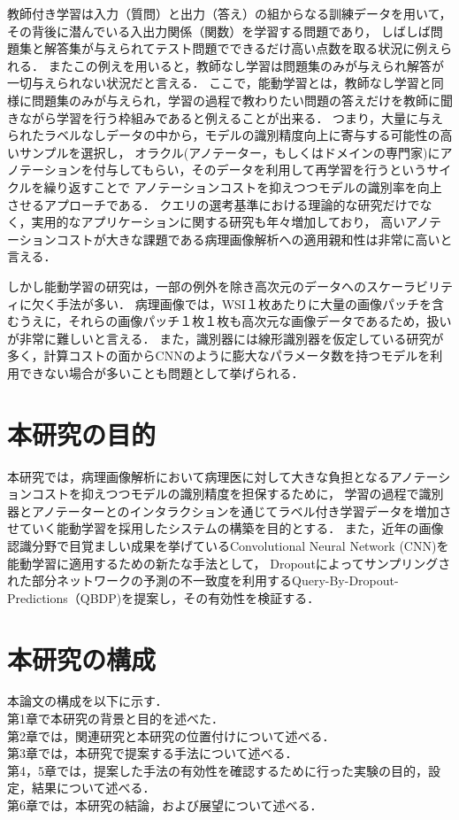 教師付き学習は入力（質問）と出力（答え）の組からなる訓練データを用いて， その背後に潜んでいる入出力関係（関数）を学習する問題であり，
しばしば問題集と解答集が与えられてテスト問題でできるだけ高い点数を取る状況に例えられる．
またこの例えを用いると，教師なし学習は問題集のみが与えられ解答が一切与えられない状況だと言える．
ここで，能動学習とは，教師なし学習と同様に問題集のみが与えられ，学習の過程で教わりたい問題の答えだけを教師に聞きながら学習を行う枠組みであると例えることが出来る．
つまり，大量に与えられたラベルなしデータの中から，モデルの識別精度向上に寄与する可能性の高いサンプルを選択し，
オラクル(アノテーター，もしくはドメインの専門家)にアノテーションを付与してもらい，そのデータを利用して再学習を行うというサイクルを繰り返すことで
アノテーションコストを抑えつつモデルの識別率を向上させるアプローチである．
クエリの選考基準における理論的な研究だけでなく，実用的なアプリケーションに関する研究も年々増加しており，
高いアノテーションコストが大きな課題である病理画像解析への適用親和性は非常に高いと言える．

しかし能動学習の研究は，一部の例外を除き高次元のデータへのスケーラビリティに欠く手法が多い．
病理画像では，WSI１枚あたりに大量の画像パッチを含むうえに，それらの画像パッチ１枚１枚も高次元な画像データであるため，扱いが非常に難しいと言える．
また，識別器には線形識別器を仮定している研究が多く，計算コストの面からCNNのように膨大なパラメータ数を持つモデルを利用できない場合が多いことも問題として挙げられる．

\section{本研究の目的}
本研究では，病理画像解析において病理医に対して大きな負担となるアノテーションコストを抑えつつモデルの識別精度を担保するために，
学習の過程で識別器とアノテーターとのインタラクションを通じてラベル付き学習データを増加させていく能動学習を採用したシステムの構築を目的とする．
また，近年の画像認識分野で目覚ましい成果を挙げているConvolutional Neural Network (CNN)を能動学習に適用するための新たな手法として，
Dropoutによってサンプリングされた部分ネットワークの予測の不一致度を利用するQuery-By-Dropout-Predictions（QBDP)を提案し，その有効性を検証する．


\section{本研究の構成}
本論文の構成を以下に示す．\\
第1章で本研究の背景と目的を述べた． \\
第2章では，関連研究と本研究の位置付けについて述べる．\\
第3章では，本研究で提案する手法について述べる．\\
第4，5章では，提案した手法の有効性を確認するために行った実験の目的，設定，結果について述べる．\\
第6章では，本研究の結論，および展望について述べる．


